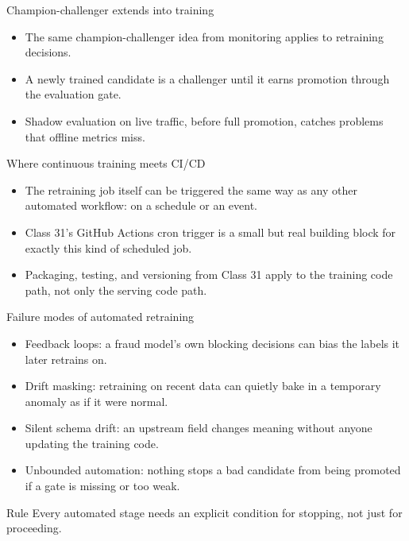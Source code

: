 \begin{frame}{Champion-challenger extends into training}
\begin{itemize}
\item The same champion-challenger idea from monitoring applies to retraining decisions.
\item A newly trained candidate is a challenger until it earns promotion through the evaluation gate.
\item Shadow evaluation on live traffic, before full promotion, catches problems that offline metrics miss.
\end{itemize}
\coursefooter
\end{frame}

\begin{frame}{Where continuous training meets CI/CD}
\begin{itemize}
\item The retraining job itself can be triggered the same way as any other automated workflow: on a schedule or an event.
\item Class 31's GitHub Actions cron trigger is a small but real building block for exactly this kind of scheduled job.
\item Packaging, testing, and versioning from Class 31 apply to the training code path, not only the serving code path.
\end{itemize}
\coursefooter
\end{frame}

\begin{frame}{Failure modes of automated retraining}
\begin{itemize}
\item Feedback loops: a fraud model's own blocking decisions can bias the labels it later retrains on.
\item Drift masking: retraining on recent data can quietly bake in a temporary anomaly as if it were normal.
\item Silent schema drift: an upstream field changes meaning without anyone updating the training code.
\item Unbounded automation: nothing stops a bad candidate from being promoted if a gate is missing or too weak.
\end{itemize}
\begin{block}{Rule}
Every automated stage needs an explicit condition for stopping, not just for proceeding.
\end{block}
\coursefooter
\end{frame}

